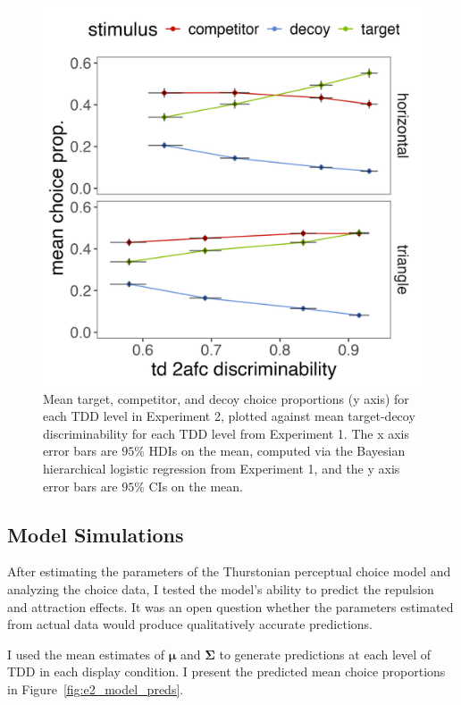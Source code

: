 \begin{figure}
   \includegraphics[width=\textwidth]{figures/choicePhase_att_trials_compare_to_2afc_collapsed.jpeg}
   \caption{Mean target, competitor, and decoy choice proportions (y axis) for each TDD level in Experiment 2, plotted against mean target-decoy discriminability for each TDD level from Experiment 1. The x axis error bars are $95\%$ HDIs on the mean, computed via the Bayesian hierarchical logistic regression from Experiment 1, and the y axis error bars are $95\%$ CIs on the mean.}
   \label{fig:e2_choice_compare_to_2afc}
\end{figure}

\subsection{Model Simulations}
After estimating the parameters of the Thurstonian perceptual choice model and analyzing the choice data, I tested the model's ability to predict the repulsion and attraction effects. It was an open question whether the parameters estimated from actual data would produce qualitatively accurate predictions.

I used the mean estimates of $\boldsymbol{\mu}$ and $\boldsymbol{\Sigma}$ to generate predictions at each level of TDD in each display condition. I present the predicted mean choice proportions in Figure~\ref{fig:e2_model_preds}. 

